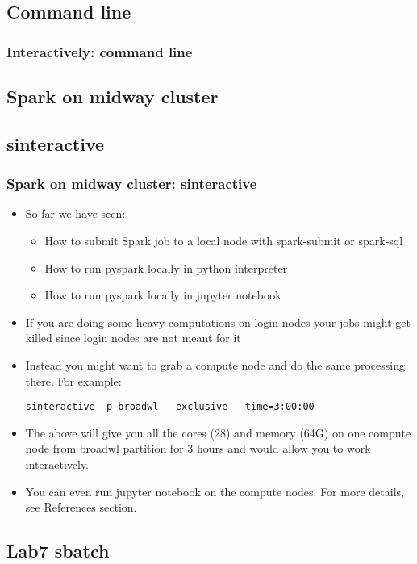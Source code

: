 \documentclass{beamer}
\begin{document}
\subsection{Command line}
\begin{frame}[fragile]
  \frametitle{Interactively: command line}
  \begin{itemize}



\section{Spark on midway cluster}
\subsection{sinteractive}
\begin{frame}[fragile]
  \frametitle{Spark on midway cluster: sinteractive}
  \begin{itemize}
  \item So far we have seen:
    \begin{itemize}
    \item How to submit Spark job to a local node with {\color{mycolorcli}spark-submit} or {\color{mycolorcli}spark-sql}
    \item How to run pyspark locally in python interpreter
    \item How to run pyspark locally in jupyter notebook
    \end{itemize}
  \item If you are doing some heavy computations on login nodes your jobs might get killed since login nodes are not meant for it
  \item Instead you might want to grab a compute node and do the same processing there. For example:
    {\color{mycolorcli}
\begin{verbatim}
sinteractive -p broadwl --exclusive --time=3:00:00
\end{verbatim}
    }
  \item The above will give you all the cores (28) and memory (64G) on one compute node from broadwl partition for 3 hours and would allow you to work interactively.
  \item You can even run jupyter notebook on the compute nodes. For more details, see References section.
\end{itemize}
\end{frame}

\subsection{Lab7 sbatch}

\end{itemize}
\end{frame}
\end{document}
